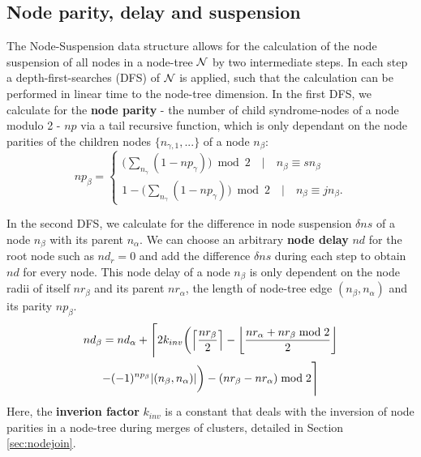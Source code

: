 \subsection{Node parity, delay and suspension}\label{sec:paritydelaysus}

The Node-Suspension data structure allows for the calculation of the node suspension of all nodes in a node-tree $\mathcal{N}$ by two intermediate steps. In each step a depth-first-searches (DFS) of $\mathcal{N}$ is applied, such that the calculation can be performed in linear time to the node-tree dimension. In the first DFS, we calculate for the \textbf{node parity} - the number of child syndrome-nodes of a node modulo 2 - $np$ via a tail recursive function, which is only dependant on the node parities of the children nodes $\{n_{\gamma,1}, ...\}$ of a node $n_\beta$:
\begin{equation}\label{eq:nodeparity}
np_\beta =
\begin{cases}
    \big( \sum_{n_\gamma} (1-np_\gamma) \big ) \bmod 2 \hspace{1em} | \hspace{1em} n_\beta \equiv sn_\beta \\
    1 - \big( \sum_{n_\gamma} (1-np_\gamma) \big ) \bmod 2 \hspace{1em} | \hspace{1em} n_\beta \equiv jn_\beta.
\end{cases} 
\end{equation}

In the second DFS, we calculate for the difference in node suspension $\delta ns$ of a node $n_\beta$ with its parent $n_\alpha$. We can choose an arbitrary \textbf{node delay} $nd$ for the root node such as $nd_r=0$ and add the difference $\delta ns$ during each step to obtain $nd$ for every node. This node delay of a node $n_\beta$ is only dependent on the node radii of itself $nr_\beta$ and its parent $nr_\alpha$, the length of node-tree edge $(n_\beta, n_\alpha)$ and its parity $np_\beta$. 
\begin{multline}\label{eq:delayequation}
    nd_\beta = nd_\alpha + \Bigg \lceil 2k_{inv}\bigg(\ceil{\frac{nr_\beta}{2}} - \floor{\frac{nr_\alpha + nr_\beta \bmod 2}{2}}\\
    - (-1)^{np_\beta}\abs{(n_\beta,n_\alpha)}\bigg) - (nr_\beta - nr_\alpha) \bmod 2 \Bigg \rceil
\end{multline}
Here, the \textbf{inverion factor} $k_{inv}$ is a constant that deals with the inversion of node parities in a node-tree during merges of clusters, detailed in Section \ref{sec:nodejoin}. 

